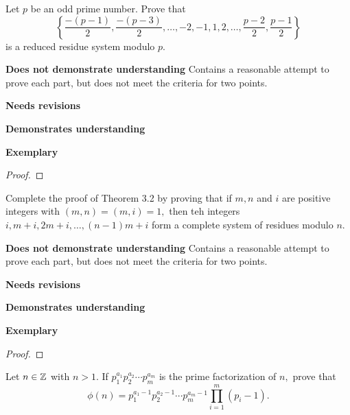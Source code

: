 \documentclass[letterpaper, 11pt]{../ximera}
\begin{document}
\begin{ex}[Exercise 74]
	Let $p$ be an odd prime number. Prove that
	\[\left\{\frac{-(p-1)}{2}, \frac{-(p-3)}{2},\dots, -2,-1,1,2,\dots,\frac{p-2}{2},\frac{p-1}{2}\right\}\]
	is a reduced residue system modulo $p$.
\end{ex}

\begin{writeRubric}
    \item \textbf{Does not demonstrate understanding}
     Contains a reasonable attempt to prove each part, but does not meet the criteria for two points.
    \item \textbf{Needs revisions}
     
    \item \textbf{Demonstrates understanding}
    
    \item \textbf{Exemplary}
        
\end{writeRubric}
                                       \begin{proof}
 
\end{proof}


\begin{ex}
 	Complete the proof of Theorem 3.2 by proving that if $m,n$ and $i$ are positive integers with $(m,n)=(m,i)=1,$ then teh integers $i,m+i,2m+i,\dots,(n-1)m+i$ form a complete system of residues modulo $n$.
\end{ex}

\begin{writeRubric}
    \item \textbf{Does not demonstrate understanding}
     Contains a reasonable attempt to prove each part, but does not meet the criteria for two points.
    \item \textbf{Needs revisions}
     
    \item \textbf{Demonstrates understanding}
    
    \item \textbf{Exemplary}
        
\end{writeRubric}
                                       \begin{proof}
 
\end{proof}

\begin{ex}
 	Let $n\in\mathbb Z$ with $n>1.$ If $p_1^{a_1}p_2^{a_2}\cdots p_m^{a_m}$ is the prime factorization of $n,$ prove that 
	\[\phi(n)=p_1^{a_1-1}p_2^{a_2-1}\cdots p_m^{a_m-1}\prod_{i=1}^m(p_i-1).\]
\end{ex}
\end{document}
